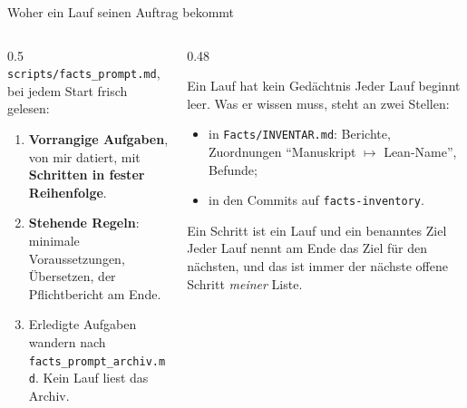 \documentclass[11pt,aspectratio=169]{beamer}
\newcommand{\datei}[1]{\texttt{#1}}
\begin{document}
\begin{frame}{Woher ein Lauf seinen Auftrag bekommt}
  \small
  \begin{columns}[T]
    \begin{column}{0.5\textwidth}
      \datei{scripts/facts\_prompt.md}, bei jedem Start frisch gelesen:
      \begin{enumerate}
      \item \textbf{Vorrangige Aufgaben}, von mir datiert, mit
        \textbf{Schritten in fester Reihenfolge}.
      \item \textbf{Stehende Regeln}: minimale Voraussetzungen, Übersetzen,
        der Pflichtbericht am Ende.
      \item Erledigte Aufgaben wandern nach \datei{facts\_prompt\_archiv.md}.
        Kein Lauf liest das Archiv.
      \end{enumerate}
    \end{column}
    \begin{column}{0.48\textwidth}
      \begin{block}{Ein Lauf hat kein Gedächtnis}
        Jeder Lauf beginnt leer. Was er wissen muss, steht an zwei Stellen:
        \begin{itemize}
        \item in \datei{Facts/INVENTAR.md}: Berichte, Zuordnungen
          \enquote{Manuskript $\mapsto$ Lean-Name}, Befunde;
        \item in den Commits auf \texttt{facts-inventory}.
        \end{itemize}
      \end{block}
      \begin{block}{Ein Schritt ist ein Lauf und ein benanntes Ziel}
        Jeder Lauf nennt am Ende das Ziel für den nächsten, und das ist immer der
        nächste offene Schritt \emph{meiner} Liste.
      \end{block}
    \end{column}
  \end{columns}
\end{frame}
\end{document}
